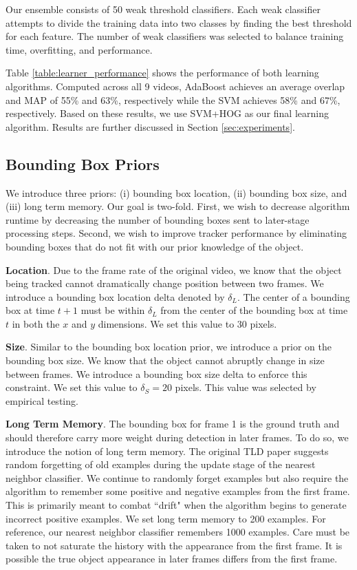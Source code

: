 \documentclass[10pt,twocolumn,letterpaper]{article}
\begin{document}
Our ensemble consists of 50 weak threshold classifiers. Each weak classifier attempts to divide the training data into two classes by finding the best threshold for each feature. The number of weak classifiers was selected to balance training time, overfitting, and performance.

Table \ref{table:learner_performance} shows the performance of both learning algorithms. Computed across all 9 videos, AdaBoost achieves an average overlap and MAP of 55\% and 63\%, respectively while the SVM achieves 58\% and 67\%, respectively. Based on these results, we use SVM+HOG as our final learning algorithm. Results are further discussed in Section \ref{sec:experiments}.

\subsection{Bounding Box Priors}

We introduce three priors: (i) bounding box location, (ii) bounding box size, and (iii) long term memory. Our goal is two-fold. First, we wish to decrease algorithm runtime by decreasing the number of bounding boxes sent to later-stage processing steps. Second, we wish to improve tracker performance by eliminating bounding boxes that do not fit with our prior knowledge of the object.

\textbf{Location}. Due to the frame rate of the original video, we know that the object being tracked cannot dramatically change position between two frames. 
We introduce a bounding box location delta denoted by $\delta_L$. The center of a bounding box at time $t+1$ must be within $\delta_L$ from the center of the bounding box at time $t$ in both the $x$ and $y$ dimensions. We set this value to 30 pixels.

\textbf{Size}. Similar to the bounding box location prior, we introduce a prior on the bounding box size. We know that the object cannot abruptly change in size between frames. We introduce a bounding box size delta to enforce this constraint. We set this value to $\delta_S=20$ pixels. This value was selected by empirical testing.

\textbf{Long Term Memory}. The bounding box for frame 1 is the ground truth and should therefore carry more weight during detection in later frames. To do so, we introduce the notion of long term memory. The original TLD paper suggests random forgetting of old examples during the update stage of the nearest neighbor classifier. We continue to randomly forget examples but also require the algorithm to remember some positive and negative examples from the first frame. This is primarily meant to combat ``drift" when the algorithm begins to generate incorrect positive examples. We set long term memory to 200 examples. For reference, our nearest neighbor classifier remembers 1000 examples. Care must be taken to not saturate the history with the appearance from the first frame. It is possible the true object appearance in later frames differs from the first frame.
\end{document}
